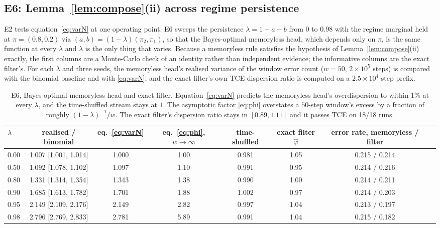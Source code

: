 \documentclass[11pt,a4paper]{article}
\numberwithin{equation}{section}
\theoremstyle{plain}
\theoremstyle{definition}
\theoremstyle{remark}
\begin{document}
\subsection{E6: Lemma~\ref{lem:compose}(ii) across regime persistence}\label{sec:e6}
E2 tests equation~\eqref{eq:varN} at one operating point. E6 sweeps the persistence $\lambda=1-a-b$ from $0$ to $0.98$ with the regime marginal held at $\pi=(0.8,0.2)$ via $(a,b)=(1-\lambda)(\pi_2,\pi_1)$, so that the Bayes-optimal memoryless head, which depends only on $\pi$, is the same function at every $\lambda$ and $\lambda$ is the only thing that varies. Because a memoryless rule satisfies the hypothesis of Lemma~\ref{lem:compose}(ii) exactly, the first columns are a Monte-Carlo check of an identity rather than independent evidence; the informative columns are the exact filter's. For each $\lambda$ and three seeds, the memoryless head's realised variance of the window error count ($w=50$, $2\times10^5$ steps) is compared with the binomial baseline and with \eqref{eq:varN}, and the exact filter's own TCE dispersion ratio is computed on a $2.5\times10^4$-step prefix.
\begin{table}[h]\centering\scriptsize\setlength{\tabcolsep}{4pt}
\begin{tabular}{@{}lccccccc@{}}\toprule
$\lambda$ & realised / binomial & eq.~\eqref{eq:varN} & eq.~\eqref{eq:phi}, $w\to\infty$ & time-shuffled & exact filter $\hat\varphi$ & error rate, memoryless / filter\\\midrule
0.00 & 1.007 [1.001, 1.014] & 1.000 & 1.00 & 0.981 & 1.05 & 0.215 / 0.214\\
0.50 & 1.092 [1.078, 1.102] & 1.097 & 1.10 & 0.991 & 0.95 & 0.214 / 0.216\\
0.80 & 1.331 [1.314, 1.354] & 1.343 & 1.38 & 0.990 & 1.00 & 0.214 / 0.211\\
0.90 & 1.685 [1.613, 1.782] & 1.701 & 1.88 & 1.002 & 0.97 & 0.214 / 0.203\\
0.95 & 2.149 [2.109, 2.176] & 2.149 & 2.82 & 0.997 & 1.04 & 0.213 / 0.197\\
0.98 & 2.796 [2.769, 2.833] & 2.781 & 5.89 & 0.991 & 1.04 & 0.215 / 0.182\\
\bottomrule\end{tabular}
\caption{E6, Bayes-optimal memoryless head and exact filter. Equation~\eqref{eq:varN} predicts the memoryless head's overdispersion to within 1\% at every $\lambda$, and the time-shuffled stream stays at $1$. The asymptotic factor \eqref{eq:phi} overstates a $50$-step window's excess by a fraction of roughly $(1-\lambda)^{-1}/w$. The exact filter's dispersion ratio stays in $[0.89,1.11]$ and it passes TCE on 18/18 runs.}\label{tab:e6}
\end{table}
\end{document}
